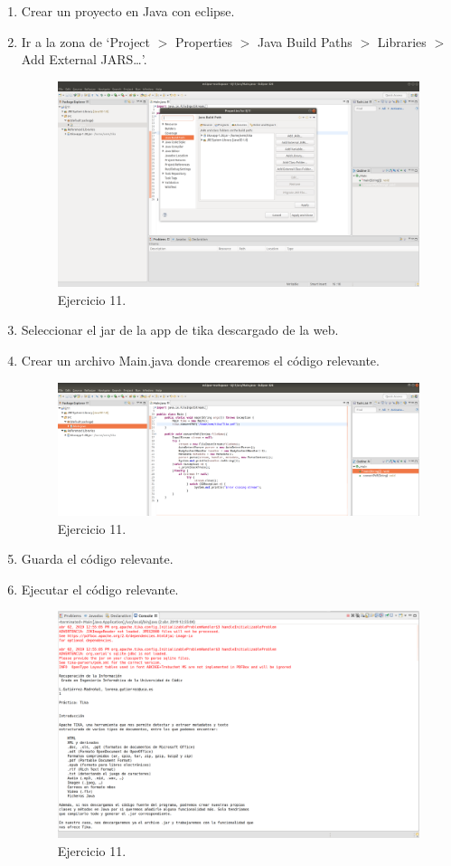 \documentclass{article}
\begin{document}
\begin{enumerate}
\begin{enumerate}
            \item Crear un proyecto en Java con eclipse.
            \item Ir a la zona de `Project $>$ Properties $>$ Java Build Paths $>$ Libraries $>$ Add External JARS\ldots'.
                \begin{figure}[H]
                \centering
                \includegraphics[width=0.7\linewidth]{./ej18}
                \caption{Ejercicio 11.}
                \end{figure}
            \item Seleccionar el jar de la app de tika descargado de la web.
            \item Crear un archivo Main.java donde crearemos el código relevante.
                \begin{figure}[H]
                \centering
                \includegraphics[width=0.7\linewidth]{./ej19}
                \caption{Ejercicio 11.}
                \end{figure}
            \item Guarda el código relevante.
            \item Ejecutar el código relevante.
                \begin{figure}[H]
                \centering
                \includegraphics[width=0.7\linewidth]{./ej20}
                \caption{Ejercicio 11.}
                \end{figure}
        \end{enumerate}
\end{enumerate}
\end{document}
